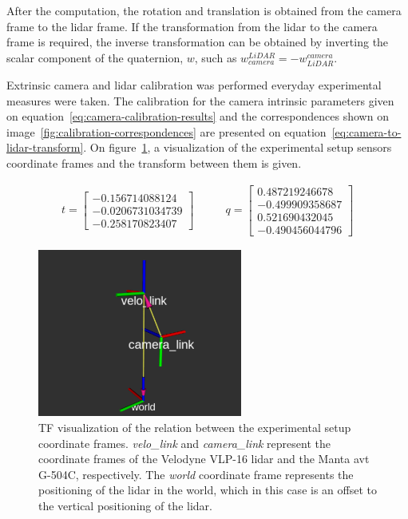 After the computation, the rotation and translation is obtained from the camera frame to the \ac{lidar} frame. If the transformation from the \ac{lidar} to the camera frame is required, the inverse transformation can be obtained by inverting the scalar component of the quaternion, $w$, such as $w^{LiDAR}_{camera} = - w^{camera}_{LiDAR}$. 

Extrinsic camera and \ac{lidar} calibration was performed everyday  experimental measures were taken. The calibration for the camera intrinsic parameters given on equation~\ref{eq:camera-calibration-results} and the correspondences shown on image~\ref{fig:calibration-correspondences} are presented on equation~\ref{eq:camera-to-lidar-transform}. On figure~\ref{fig:extrinsic-calibration-frames}, a visualization of the experimental setup sensors coordinate frames and the transform between them is given.

\begin{subequations}
	\label{eq:camera-to-lidar-transform}
	\begin{align}
		t = \begin{bmatrix}
			-0.156714088124  \\
			-0.0206731034739 \\
			-0.258170823407
		\end{bmatrix}
		& \qquad
		q = \begin{bmatrix} 
		0.487219246678  \\
		-0.499909358687 \\
		0.521690432045  \\
		-0.490456044796
	\end{bmatrix}
	\end{align}
\end{subequations}

\begin{figure}[H]
	\centering
	\includegraphics[width=0.6\textwidth]{img/calibration/extrinsic-calibration-frames.png}
	\caption{TF visualization of the relation between the experimental setup coordinate frames. \emph{velo\_link} and \emph{camera\_link} represent the coordinate frames of the Velodyne VLP-16 \ac{lidar} and the Manta \ac{avt} G-504C, respectively. The \emph{world} coordinate frame represents the positioning of the \ac{lidar} in the world, which in this case is an offset to the vertical positioning of the \ac{lidar}.}
	\label{fig:extrinsic-calibration-frames}
\end{figure}

